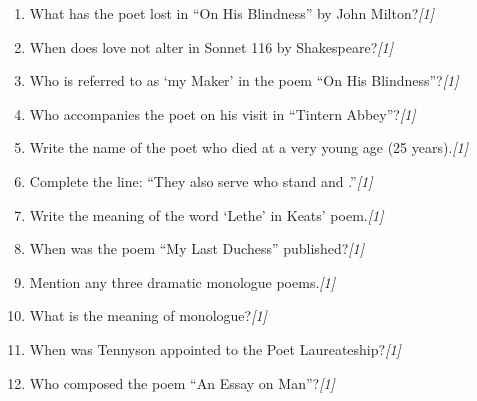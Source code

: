 \documentclass[11pt,a4paper]{article}
\newcommand{\pts}[1]{\hfill \textit{[#1]}}
\begin{document}
\begin{enumerate}[label=(\alph*),leftmargin=*,itemsep=6pt]

  \item What has the poet lost in ``On His Blindness'' by John Milton?\pts{1}
  \item When does love not alter in Sonnet 116 by Shakespeare?\pts{1}
  \item Who is referred to as `my Maker' in the poem ``On His Blindness''?\pts{1}
  \item Who accompanies the poet on his visit in ``Tintern Abbey''?\pts{1}
  \item Write the name of the poet who died at a very young age (25 years).\pts{1}
  \item Complete the line: ``They also serve who stand and \underline{\hspace{2cm}}.''\pts{1}
  \item Write the meaning of the word `Lethe' in Keats' poem.\pts{1}
  \item When was the poem ``My Last Duchess'' published?\pts{1}
  \item Mention any three dramatic monologue poems.\pts{1}
  \item What is the meaning of monologue?\pts{1}
  \item When was Tennyson appointed to the Poet Laureateship?\pts{1}
  \item Who composed the poem ``An Essay on Man''?\pts{1}

\end{enumerate}
\end{document}
